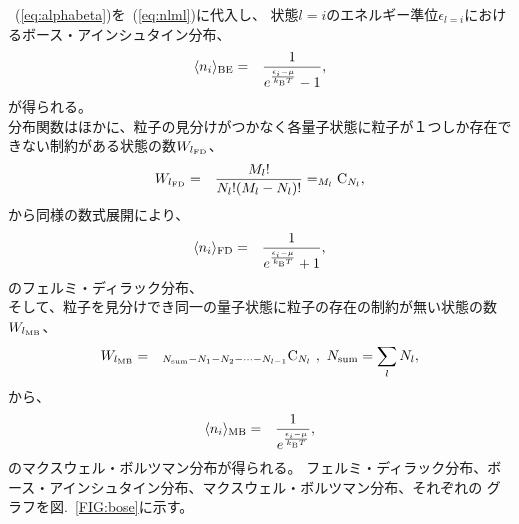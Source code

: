 \documentclass[12pt,a4paper]{jbook}
\newcommand{\kb} {k_{\rm B}}				%
\begin{document}
        	~(\ref{eq:alphabeta})を~(\ref{eq:nlml})に代入し、
        	状態$l=i$のエネルギー準位$\epsilon_{l=i}$におけるボース・アインシュタイン分布、
		\begin{eqnarray}
            	\label{eq:becdist}
			\langle n_i \rangle_{\rm BE}
			& = &
			\frac{1}{e^{\frac{\epsilon_i - \mu}{{\kb} T}} - 1},
		\end{eqnarray}
        	が得られる。
        	\\
        	分布関数はほかに、粒子の見分けがつかなく各量子状態に粒子が１つしか存在できない制約がある状態の数$W_{l_{\rm FD}}$、
        	\begin{eqnarray}
           		W_{l_{\rm FD}} & = & \frac{M_l !}{N_l ! (M_l - N_l)!} =  _{M_l}{\rm C}_{N_l},
        	\end{eqnarray}
        	から同様の数式展開により、
        	\begin{eqnarray}
           	 \langle n_i \rangle_{\rm FD}
           	 & = & 
			\frac{1}{e^{\frac{\epsilon_i - \mu}{{\kb} T}} + 1},
        	\end{eqnarray}
        	のフェルミ・ディラック分布、
        	\\
        	そして、粒子を見分けでき同一の量子状態に粒子の存在の制約が無い状態の数$W_{l_{\rm MB}}$、
        	\begin{eqnarray}
            		W_{l_{\rm MB}} & = & _{N_{\rm sum} - N_1 - N_2 - \cdots - N_{l-1}}{\rm C}_{N_l} \ , \ N_{\rm sum} = \sum_l N_l,
        	\end{eqnarray}
        	から、
        	\begin{eqnarray}
            		\langle n_i \rangle_{\rm MB}
            		& = & 
			\frac{1}{e^{\frac{\epsilon_i - \mu}{{\kb} T}} },
        	\end{eqnarray}
       		のマクスウェル・ボルツマン分布が得られる。
		フェルミ・ディラック分布、ボース・アインシュタイン分布、マクスウェル・ボルツマン分布、それぞれの
        	グラフを図.~\ref{FIG:bose}に示す。
\end{document}
